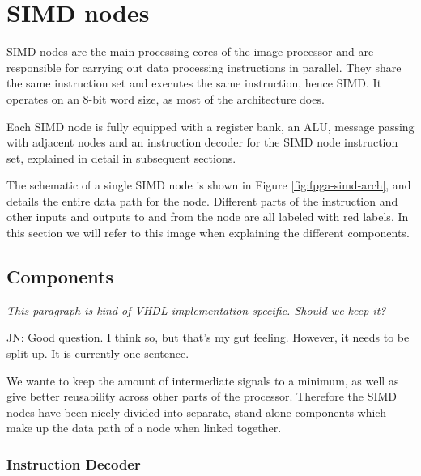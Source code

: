 \section{SIMD nodes}

\ac{SIMD} nodes are the main processing cores of the image processor and are
responsible for carrying out data processing instructions in parallel. They
share the same instruction set and executes the same instruction, hence
\acf{SIMD}. It operates on an 8-bit word size, as most of the
architecture does.

Each \ac{SIMD} node is fully equipped with a register bank, an \ac{ALU}, message
passing with adjacent nodes and an instruction decoder for the \ac{SIMD} node
instruction set, explained in detail in subsequent sections.

The schematic of a single \ac{SIMD} node is shown in Figure
\ref{fig:fpga-simd-arch}, and details the entire data path for the
node. Different parts of the instruction and other inputs and outputs to and
from the node are all labeled with red labels. In this
section we will refer to this image when explaining the different components.




\subsection{Components}

{\em \color{red} This paragraph is kind of VHDL implementation specific. Should
  we keep it?

  JN: Good question. I think so, but that's my gut feeling. However, it needs to
  be split up. It is currently one sentence.}

We wante to keep the amount of intermediate signals to a minimum, as well as
give better reusability across other parts of the processor. Therefore the SIMD
nodes have been nicely divided into separate, stand-alone components which make
up the data path of a node when linked together.

\subsubsection{Instruction Decoder}


